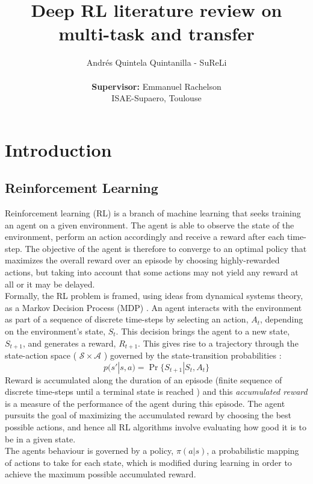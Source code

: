 \documentclass{article}
\title{Deep RL literature review on multi-task and transfer}
\author{
Andrés Quintela Quintanilla - SuReLi \\
\vspace{0.1cm}\\
\textbf{Supervisor:} Emmanuel Rachelson\\
ISAE-Supaero, Toulouse
}
\begin{document}
\maketitle

\section{Introduction}
\subsection{Reinforcement Learning}
Reinforcement learning (RL) is a branch of machine learning that seeks training an agent on a given environment. The agent is able to observe the state of the environment, perform an action accordingly and receive a reward after each time-step. The objective of the agent is therefore to converge to an optimal policy that maximizes the overall reward over an episode by choosing highly-rewarded actions, but taking into account that some actions may not yield any reward at all or it may be delayed. \newline
\\
Formally, the RL problem is framed, using ideas from dynamical systems theory, as a Markov Decision Process (MDP) \cite{Sutton1998ReinforcementIntroduction}. An agent interacts with the environment as part of a sequence of discrete time-steps by selecting an action, $A_{t}$, depending on the environment's state, $S_{t}$. This decision brings the agent to a new state, $S_{t+1}$, and generates a reward, $R_{t+1}$.
This gives rise to a trajectory through the state-action space ( $\mathcal{S} \times \mathcal{A}$ ) governed by the state-transition probabilities \citep{Sutton1998ReinforcementIntroduction}:
\begin{equation}
    p(s'|s,a) = \Pr \{ S_{t+1}|S_{t}, A_{t} \}
\end{equation}
Reward is accumulated along the duration of an episode (finite sequence of discrete time-steps until a terminal state is reached \citep{Sutton1998ReinforcementIntroduction}) and this \textit{accumulated reward} is a measure of the performance of the agent during this episode. The agent pursuits the goal of maximizing the accumulated reward by choosing the best possible actions, and hence all RL algorithms involve evaluating how good it is to be in a given state. \\ 
The agents behaviour is governed by a policy, $\pi (a|s)$, a probabilistic mapping of actions to take for each state, which is modified during learning in order to achieve the maximum possible accumulated reward.
\end{document}
